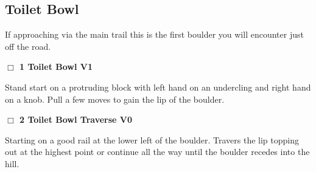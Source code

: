 \begin{multicols}{2}
\needspace{10em}
\subsection*{Toilet Bowl}\label{bf:Toilet Bowl}

If approaching via the main trail this is the first boulder you will encounter just off the road.\\



\needspace{2em}
\label{rt:Toilet Bowl}
\colorbox{green!20}{
\parbox{0.95\linewidth}{
\hspace{-1ex}\textbf{$\Box$
1 Toilet Bowl V1  
}}}
\begin{adjustwidth}{1.3em}{}			

Stand start on a protruding block with left hand on an undercling and right hand on a knob. Pull a few moves to gain the lip of the boulder.
\end{adjustwidth}




\needspace{2em}
\label{rt:Toilet Bowl Traverse}
\colorbox{green!20}{
\parbox{0.95\linewidth}{
\hspace{-1ex}\textbf{$\Box$
2 Toilet Bowl Traverse V0  
}}}
\begin{adjustwidth}{1.3em}{}			

Starting on a good rail at the lower left of the boulder. Travers the lip topping out at the highest point or continue all the way until the boulder recedes into the hill.
\end{adjustwidth}



	\end{multicols}


